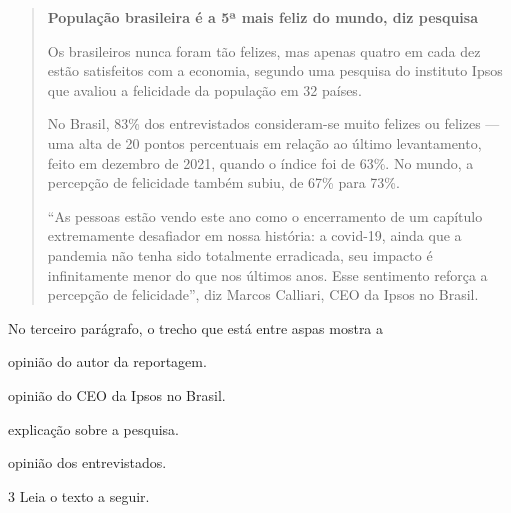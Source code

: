 \begin{quote}
\textbf{População brasileira é a 5ª mais feliz do mundo, diz pesquisa}

Os brasileiros nunca foram tão felizes, mas apenas quatro em cada dez
estão satisfeitos com a economia, segundo uma pesquisa do instituto
Ipsos que avaliou a felicidade da população em 32 países.

No Brasil, 83\% dos entrevistados consideram-se muito felizes ou felizes
--- uma alta de 20 pontos percentuais em relação ao último levantamento,
feito em dezembro de 2021, quando o índice foi de 63\%. No mundo, a
percepção de felicidade também subiu, de 67\% para 73\%.

``As pessoas estão vendo este ano como o encerramento de um capítulo
extremamente desafiador em nossa história: a covid-19, ainda que a
pandemia não tenha sido totalmente erradicada, seu impacto é
infinitamente menor do que nos últimos anos. Esse sentimento reforça a
percepção de felicidade'', diz Marcos Calliari, CEO da Ipsos no Brasil.

\end{quote}

No terceiro parágrafo, o trecho que está entre aspas mostra a

\begin{escolha}
\item opinião do autor da reportagem.

\item opinião do CEO da Ipsos no Brasil.

\item explicação sobre a pesquisa.

\item opinião dos entrevistados.
\end{escolha}

\num{3} Leia o texto a seguir.

